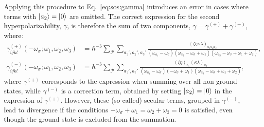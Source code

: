 \documentclass[12pt,a4paper]{article}
\begin{document}
Applying this procedure to Eq.~\eqref{eq:sos:gamma} introduces an error in cases where terms with $\ket{a_2} = \ket{0}$ are omitted. The correct expression for the second hyperpolarizability, $\gamma$, is therefore the sum of two components, $\gamma = \gamma^{(+)} + \gamma^{(-)}$, where:
\begin{align}
	\gamma_{ijkl}^{(+)}(-\omega_\sigma; \omega_1, \omega_2, \omega_3) &= \hbar^{-3} \sum_\mathcal{P} \sum_{a_1', a_2', a_3'} \frac{(\zeta \bar{\eta} \bar{\kappa} \lambda)_{a_1 a_2 a_3}}{(\omega_{a_1} - \omega_\sigma)(\omega_{a_2} - \omega_\sigma + \omega_1)(\omega_{a_3} - \omega_\sigma + \omega_1 + \omega_2)}, \nonumber\\
	\gamma_{ijkl}^{(-)}(-\omega_\sigma; \omega_1, \omega_2, \omega_3) &= \hbar^{-3} \sum_\mathcal{P} \sum_{a_1', a_3'} \frac{(\zeta \eta)_{a_1} (\kappa \lambda)_{a_3}}{(\omega_{a_1} - \omega_\sigma)(-\omega_\sigma + \omega_1)(\omega_{a_3} - \omega_\sigma + \omega_1 + \omega_2)},
\end{align}
where $\gamma^{(+)}$ corresponds to the expression when summing over all non-ground states, while $\gamma^{(-)}$ is a correction term, obtained by setting $\ket{a_2} = \ket{0}$ in the expression of $\gamma^{(+)}$. However, these (so-called) secular terms, grouped in $\gamma^{(-)}$, lead to divergence if the conditions $-\omega_\sigma + \omega_1 = \omega_2 + \omega_3 = 0$ is satisfied, even though the ground state is excluded from the summation.
\end{document}
